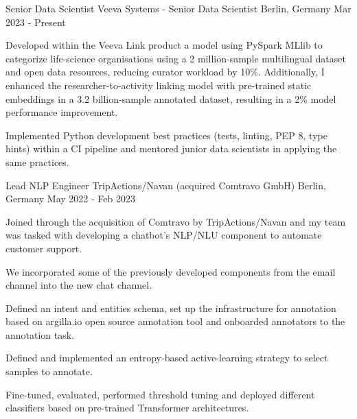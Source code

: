 

\begin{cventries}
  \cventry
    {Senior Data Scientist} %
    {Veeva Systems - Senior Data Scientist} %
    {Berlin, Germany} %
    {Mar 2023 - Present} %
	{
      \begin{cvitems} %
		\item {Developed within the Veeva Link product a model using PySpark MLlib to categorize life-science organisations using a 2 million-sample multilingual dataset and open data resources, reducing curator workload by 10\%. Additionally, I enhanced the researcher-to-activity linking model with pre-trained static embeddings in a 3.2 billion-sample annotated dataset, resulting in a 2\% model performance improvement.}
		\item {Implemented Python development best practices (tests, linting, PEP 8, type hints) within a CI pipeline and mentored junior data scientists in applying the same practices.}
      \end{cvitems}
    }

  \cventry
    {Lead NLP Engineer} %
    {TripActions/Navan (acquired Comtravo GmbH)} %
    {Berlin, Germany} %
    {May 2022 - Feb 2023} %
	{
      \begin{cvitems} %
		\item {Joined through the acquisition of Comtravo by TripActions/Navan and my team was tasked with developing a chatbot's NLP/NLU component to automate customer support.}
		\item {We incorporated some of the previously developed components from the email channel into the new chat channel.}
		\item {Defined an intent and entities schema, set up the infrastructure for annotation based on argilla.io open source annotation tool and onboarded annotators to the annotation task.}
		\item {Defined and implemented an entropy-based active-learning strategy to select samples to annotate.}
		\item {Fine-tuned, evaluated, performed threshold tuning and deployed different classifiers based on pre-trained Transformer architectures.}
      \end{cvitems}
    }



\end{cventries}

